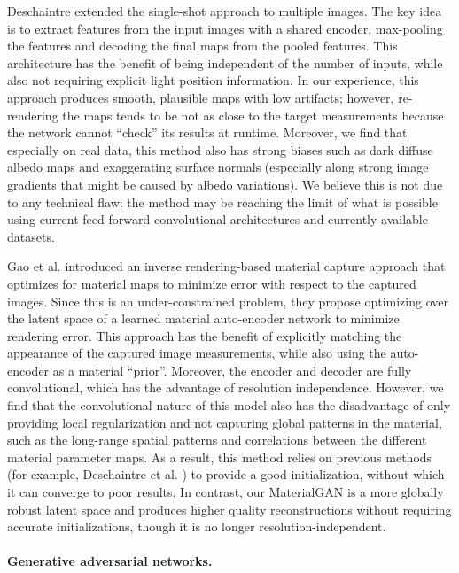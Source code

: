 Deschaintre \cite{Deschaintre2019} extended the single-shot approach to multiple images. The key idea is to extract features from the input images with a shared encoder, max-pooling the features and decoding the final maps from the pooled features. This architecture has the benefit of being independent of the number of inputs, while also not requiring explicit light position information. In our experience, this approach produces smooth, plausible maps with low artifacts; however, re-rendering the maps tends to be not as close to the target measurements because the network cannot ``check'' its results at runtime. Moreover, we find that especially on real data, this method also has strong biases such as dark diffuse albedo maps and exaggerating surface normals (especially along strong image gradients that might be caused by albedo variations). We believe this is not due to any technical flaw; the method may be reaching the limit of what is possible using current feed-forward convolutional architectures and currently available datasets.

Gao et al. \cite{Gao2019} introduced an inverse rendering-based material capture approach that optimizes for material maps to minimize error with respect to the captured images. Since this is an under-constrained problem, they propose optimizing over the latent space of a learned material auto-encoder network to minimize rendering error. This approach has the benefit of explicitly matching the appearance of the captured image measurements, while also using the auto-encoder as a material ``prior''. Moreover, the encoder and decoder are fully convolutional, which has the advantage of resolution independence.
However, we find that the convolutional nature of this model also has the disadvantage of only providing local regularization and not capturing global patterns in the material, such as the long-range spatial patterns and correlations between the different material parameter maps. As a result, this method relies on previous methods (for example, Deschaintre et al. \cite{Deschaintre2018}) to provide a good initialization, without which it can converge to poor results.
In contrast, our MaterialGAN is a more globally robust latent space and produces higher quality reconstructions without requiring accurate initializations, though it is no longer resolution-independent.

\paragraph{Generative adversarial networks.}

